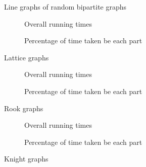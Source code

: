 \begin{figure}
  \caption{Line graphs of random bipartite graphs}
\end{figure}

\begin{figure}
  \begin{subfigure}{.5\textwidth}
    \centering
    
    \caption{Overall running times}
  \end{subfigure}%
  \begin{subfigure}{.5\textwidth}
    \centering
    
    \caption{Percentage of time taken be each part}
  \end{subfigure}
  \caption{Lattice graphs}
\end{figure}

\begin{figure}
  \begin{subfigure}{.5\textwidth}
    \centering
    
    \caption{Overall running times}
  \end{subfigure}%
  \begin{subfigure}{.5\textwidth}
    \centering
    
    \caption{Percentage of time taken be each part}
    \label{plot:colorRookDet}
  \end{subfigure}
  \caption{Rook graphs}
\end{figure}

\begin{figure}
  \begin{subfigure}{.5\textwidth}
    \centering
    
    \caption{Overall running times}
  \end{subfigure}%
  \begin{subfigure}{.5\textwidth}
    \centering
    
    \caption{Percentage of time taken be each part}
  \end{subfigure}
  \caption{Knight graphs}
\end{figure}


